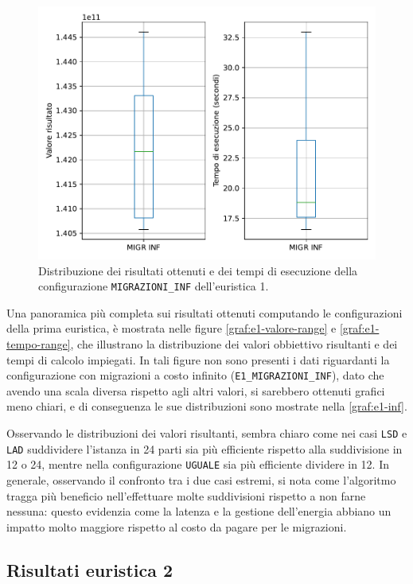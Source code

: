 \begin{figure}[t]
    \centering
    \includegraphics[scale=0.70]{img/grafico-e1-inf.pdf}
    \caption{Distribuzione dei risultati ottenuti e dei tempi di esecuzione della configurazione \texttt{MIGRAZIONI\_INF} dell'euristica 1.}
    \label{graf:e1-inf}
\end{figure}

Una panoramica più completa sui risultati ottenuti computando le configurazioni della prima euristica, è mostrata nelle figure \ref{graf:e1-valore-range} e \ref{graf:e1-tempo-range}, che illustrano la distribuzione dei valori obbiettivo risultanti e dei tempi di calcolo impiegati. In tali figure non sono presenti i dati riguardanti la configurazione con migrazioni a costo infinito (\texttt{E1\_MIGRAZIONI\_INF}), dato che avendo una scala diversa rispetto agli altri valori, si sarebbero ottenuti grafici meno chiari, e di conseguenza le sue distribuzioni sono mostrate nella \autoref{graf:e1-inf}.

Osservando le distribuzioni dei valori risultanti, sembra chiaro come nei casi \texttt{LSD} e \texttt{LAD} suddividere l'istanza in 24 parti sia più efficiente rispetto alla suddivisione in 12 o 24, mentre nella configurazione \texttt{UGUALE} sia più efficiente dividere in 12. In generale, osservando il confronto tra i due casi estremi, si nota come l'algoritmo tragga più beneficio nell'effettuare molte suddivisioni rispetto a non farne nessuna: questo evidenzia come la latenza e la gestione dell'energia abbiano un impatto molto maggiore rispetto al costo da pagare per le migrazioni.

\subsection{Risultati euristica 2}


